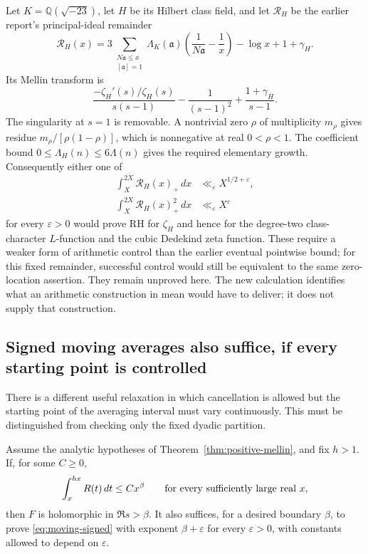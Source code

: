 Let $K=\mathbb Q(\sqrt{-23})$, let $H$ be its Hilbert class field, and
let $\mathcal R_H$ be the earlier report's principal-ideal remainder
\[
 \mathcal R_H(x)=
 3\sum_{\substack{N\mathfrak a\le x\\{}[\mathfrak a]=1}}
 \Lambda_K(\mathfrak a)\left(\frac1{N\mathfrak a}-\frac1x\right)
 -\log x+1+\gamma_H.
\]
Its Mellin transform is
\[
 \frac{-\zeta_H'(s)/\zeta_H(s)}{s(s-1)}
 -\frac1{(s-1)^2}+\frac{1+\gamma_H}{s-1}.
\]
The singularity at $s=1$ is removable. A nontrivial zero $\rho$ of
multiplicity $m_\rho$ gives residue
$m_\rho/[\rho(1-\rho)]$, which is nonnegative at real
$0<\rho<1$. The coefficient bound
$0\le\Lambda_H(n)\le6\Lambda(n)$ gives the required elementary growth.
Consequently either one of
\begin{align*}
 \int_X^{2X}\mathcal R_H(x)_+\,dx
    &\ll_\varepsilon X^{1/2+\varepsilon},\\
 \int_X^{2X}\mathcal R_H(x)_+^2\,dx
    &\ll_\varepsilon X^\varepsilon
\end{align*}
for every $\varepsilon>0$ would prove RH for $\zeta_H$ and hence for the
degree-two class-character $L$-function and the cubic Dedekind zeta function.
These require a weaker form of arithmetic control than the earlier eventual
pointwise bound; for this fixed remainder, successful control would still
be equivalent to the same zero-location assertion. They remain unproved here. The new calculation identifies what an
arithmetic construction in mean would have to deliver; it does not supply
that construction.

\subsection{Signed moving averages also suffice, if every starting point is controlled}

There is a different useful relaxation in which cancellation is allowed but
the starting point of the averaging interval must vary continuously. This
must be distinguished from checking only the fixed dyadic partition.

\begin{theorem}\label{thm:moving-window}
Assume the analytic hypotheses of Theorem~\ref{thm:positive-mellin}, and
fix $h>1$. If, for some $C\ge0$,
\begin{equation}\label{eq:moving-signed}
 \int_x^{hx}R(t)\,dt\le Cx^\beta
 \qquad\hbox{for every sufficiently large real }x,
\end{equation}
then $F$ is holomorphic in $\Re s>\beta$.
It also suffices, for a desired boundary $\beta$, to prove
\eqref{eq:moving-signed} with exponent $\beta+\varepsilon$ for every
$\varepsilon>0$, with constants allowed to depend on $\varepsilon$.
\end{theorem}

